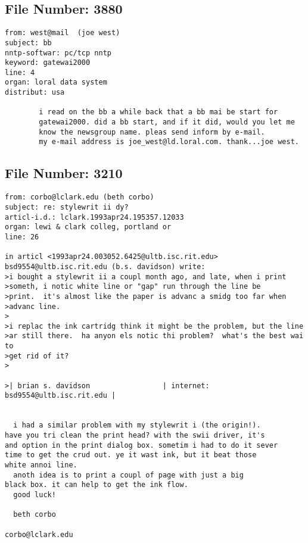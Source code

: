 \subsection{File Number: 3880}
\begin{verbatim}
from: west@mail  (joe west)
subject: bb 
nntp-softwar: pc/tcp nntp
keyword: gatewai2000 
line: 4         
organ: loral data system
distribut: usa 

        i read on the bb a while back that a bb mai be start for
        gatewai2000. did a bb start, and if it did, would you let me
        know the newsgroup name. pleas send inform by e-mail.
        my e-mail address is joe_west@ld.loral.com. thank...joe west.

\end{verbatim}
\subsection{File Number: 3210}
\begin{verbatim}
from: corbo@lclark.edu (beth corbo)
subject: re: stylewrit ii dy?
articl-i.d.: lclark.1993apr24.195357.12033
organ: lewi & clark colleg, portland or
line: 26

in articl <1993apr24.003052.6425@ultb.isc.rit.edu> bsd9554@ultb.isc.rit.edu (b.s. davidson) write:
>i bought a stylewrit ii a coupl month ago, and late, when i print
>someth, i notic white line or "gap" run through the line be
>print.  it's almost like the paper is advanc a smidg too far when
>advanc line.  
>
>i replac the ink cartridg think it might be the problem, but the line
>ar still there.  ha anyon els notic thi problem?  what's the best wai to
>get rid of it?
>

>| brian s. davidson                 | internet: bsd9554@ultb.isc.rit.edu |


  i had a similar problem with my stylewrit i (the origin!).
have you tri clean the print head? with the swii driver, it's
and option in the print dialog box. sometim i had to do it sever
time to get the crud out. ye it wast ink, but it beat those
white annoi line.
  anoth idea is to print a coupl of page with just a big
black box. it can help to get the ink flow.
  good luck!

  beth corbo

corbo@lclark.edu
\end{verbatim}
